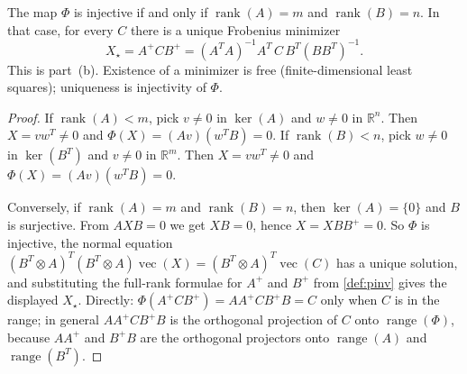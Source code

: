 \documentclass[11pt,a4paper]{article}
\DeclareMathOperator{\rank}{rank}
\begin{document}
\begin{lemma}
\label{lem:phi-injective}
The map \(\Phi\) is injective if and only if \(\rank(A)=m\) and \(\rank(B)=n\). In that case, for every \(C\) there is a unique Frobenius minimizer
\[
X_{\star}
=
A^{+}CB^{+}
=
(A^{T}A)^{-1}A^{T}\,C\,B^{T}(BB^{T})^{-1}.
\]
This is part~(b). Existence of a minimizer is free (finite-dimensional least squares); uniqueness is injectivity of \(\Phi\).
\end{lemma}

\begin{proof}
If \(\rank(A)<m\), pick \(v\neq 0\) in \(\operatorname{ker}(A)\) and \(w\neq 0\) in \(\mathbb{R}^{n}\). Then \(X=vw^{T}\neq 0\) and \(\Phi(X)=(Av)(w^{T}B)=0\). If \(\rank(B)<n\), pick \(w\neq 0\) in \(\operatorname{ker}(B^{T})\) and \(v\neq 0\) in \(\mathbb{R}^{m}\). Then \(X=vw^{T}\neq 0\) and \(\Phi(X)=(Av)(w^{T}B)=0\).

Conversely, if \(\rank(A)=m\) and \(\rank(B)=n\), then \(\operatorname{ker}(A)=\{0\}\) and \(B\) is surjective. From \(AXB=0\) we get \(XB=0\), hence \(X=XBB^{+}=0\). So \(\Phi\) is injective, the normal equation \((B^{T}\otimes A)^{T}(B^{T}\otimes A)\operatorname{vec}(X)=(B^{T}\otimes A)^{T}\operatorname{vec}(C)\) has a unique solution, and substituting the full-rank formulae for \(A^{+}\) and \(B^{+}\) from \cref{def:pinv} gives the displayed \(X_{\star}\). Directly: \(\Phi(A^{+}CB^{+})=AA^{+}CB^{+}B=C\) only when \(C\) is in the range; in general \(AA^{+}CB^{+}B\) is the orthogonal projection of \(C\) onto \(\operatorname{range}(\Phi)\), because \(AA^{+}\) and \(B^{+}B\) are the orthogonal projectors onto \(\operatorname{range}(A)\) and \(\operatorname{range}(B^{T})\).
\end{proof}
\end{document}
